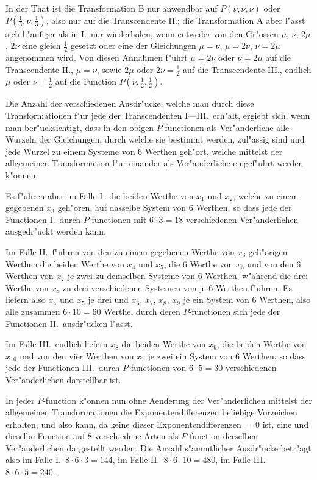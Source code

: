\documentclass[12pt,a4paper]{article}
\begin{document}
In der That ist die Transformation B nur anwendbar auf $P(\nu, \nu, \nu)$ oder $P(\frac{1}{3}, \nu, \frac{1}{3})$, also nur auf die Transcendente II.; die Transformation A aber l{"a}sst sich h{"a}ufiger als in I.\ nur wiederholen, wenn entweder von den Gr{"o}ssen $\mu$, $\nu$, $2\mu$, $2\nu$ eine gleich $\frac{1}{2}$ gesetzt oder eine der Gleichungen $\mu = \nu$, $\mu = 2\nu$, $\nu = 2\mu$ angenommen wird. Von diesen Annahmen f{"u}hrt $\mu = 2\nu$ oder $\nu = 2\mu$ auf die Transcendente II., $\mu = \nu$, sowie $2\mu$ oder $2\nu = \frac{1}{2}$ auf die Transcendente III., endlich $\mu$ oder $\nu = \frac{1}{2}$ auf die Function $P(\nu, \frac{1}{2}, \frac{1}{2})$.

Die Anzahl der verschiedenen Ausdr{"u}cke, welche man durch diese Transformationen f{"u}r jede der Transcendenten I---III.\ erh{"a}lt, ergiebt sich, wenn man ber{"u}cksichtigt, dass in den obigen $P$-functionen als Ver{"a}nderliche alle Wurzeln der Gleichungen, durch welche sie bestimmt werden, zul{"a}ssig sind und jede Wurzel zu einem Systeme von 6 Werthen geh{"o}rt, welche mittelst der allgemeinen Transformation f{"u}r einander als Ver{"a}nderliche eingef{"u}hrt werden k{"o}nnen.

Es f{"u}hren aber im Falle I.\ die beiden Werthe von $x_1$ und $x_2$, welche zu einem gegebenen $x_3$ geh{"o}ren, auf dasselbe System von 6 Werthen, so dass jede der Functionen I.\ durch $P$-functionen mit $6 \cdot 3 = 18$ verschiedenen Ver{"a}nderlichen ausgedr{"u}ckt werden kann.

Im Falle II.\ f{"u}hren von den zu einem gegebenen Werthe von $x_3$ geh{"o}rigen Werthen die beiden Werthe von $x_4$ und $x_5$, die 6 Werthe von $x_6$ und von den 6 Werthen von $x_7$ je zwei zu demselben Systeme von 6 Werthen, w{"a}hrend die drei Werthe von $x_8$ zu drei verschiedenen Systemen von je 6 Werthen f{"u}hren. Es liefern also $x_4$ und $x_5$ je drei und $x_6$, $x_7$, $x_8$, $x_9$ je ein System von 6 Werthen, also alle zusammen $6 \cdot 10 = 60$ Werthe, durch deren $P$-functionen sich jede der Functionen II.\ ausdr{"u}cken l{"a}sst.

Im Falle III.\ endlich liefern $x_8$ die beiden Werthe von $x_9$, die beiden Werthe von $x_{10}$ und von den vier Werthen von $x_7$ je zwei ein System von 6 Werthen, so dass jede der Functionen III.\ durch $P$-functionen von $6 \cdot 5 = 30$ verschiedenen Ver{"a}nderlichen darstellbar ist.

In jeder $P$-function k{"o}nnen nun ohne Aenderung der Ver{"a}nderlichen mittelst der allgemeinen Transformationen die Exponentendifferenzen beliebige Vorzeichen erhalten, und also kann, da keine dieser Exponentendifferenzen $= 0$ ist, eine und dieselbe Function auf 8 verschiedene Arten als $P$-function derselben Ver{"a}nderlichen dargestellt werden. Die Anzahl s{"a}mmtlicher Ausdr{"u}cke betr{"a}gt also im Falle I.\ $8 \cdot 6 \cdot 3 = 144$, im Falle II.\ $8 \cdot 6 \cdot 10 = 480$, im Falle III.\ $8 \cdot 6 \cdot 5 = 240$.
\end{document}
